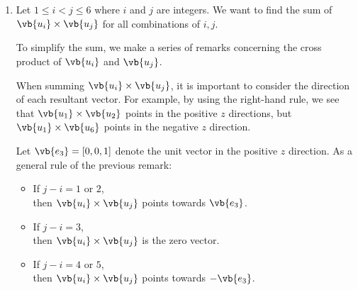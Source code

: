 \begin{enumerate}
\begin{enumerate}
\begin{proof}
                    \smallskip

                    So $I$ contains the values $-1$ and $1$ corresponding to the lower and upper bounds of $D$, respectively.
                    Since $f$ is continuous, we can use \cref{thm:ivt} to say that $I$ is a closed interval and that $(-1, 1) \subseteq I$.

                    But the codomain of $f$ is $(-1, 1)$, meaning that every element in the codomain is mapped to by some value in $D$. Hence $f$ is surjective by \cref{def:surjective}.
                \end{proof}

                \bigskip

        \end{enumerate}

    \item Let $1 \le i < j \le 6$ where $i$ and $j$ are integers.
        We want to find the sum of $\vb{u_i} \times \vb{u_j}$ for all combinations of $i, j$.

        To simplify the sum, we make a series of remarks concerning the cross product of $\vb{u_i}$ and $\vb{u_j}$.

        \smallskip

        \begin{remark}
            When summing $\vb{u_i} \times \vb{u_j}$, it is important to consider the direction of each resultant vector.
            For example, by using the right-hand rule, we see that $\vb{u_1} \times \vb{u_2}$ points in the positive $z$ directions, but $\vb{u_1} \times \vb{u_6}$ points in the negative $z$ direction.
        \end{remark}

        \smallskip

        Let $\vb{e_3} = [0, 0, 1]$ denote the unit vector in the positive $z$ direction.
        As a general rule of the previous remark:
        \begin{itemize}
            \item If $j - i = 1$ or  $2$, \\
                \hspace*{1em}then $\vb{u_i} \times \vb{u_j}$ points towards $\vb{e_3}$.
            \item If $j - i = 3$, \\
                \hspace*{1em}then $\vb{u_i} \times \vb{u_j}$ is the zero vector.
            \item If $j - i = 4$ or  $5$, \\
                \hspace*{1em}then $\vb{u_i} \times \vb{u_j}$ points towards $- \vb{e_3}$.
        \end{itemize}


\end{enumerate}
